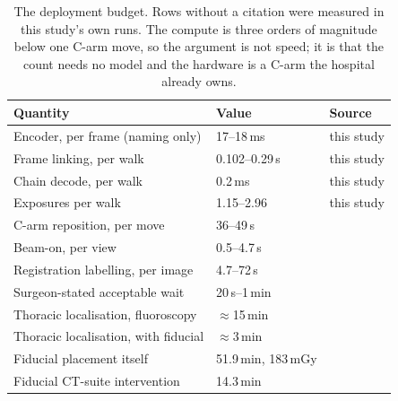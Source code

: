 \documentclass[11pt,letterpaper]{article}
\begin{document}
\begin{table}[htbp]\centering\small
\caption{The deployment budget. Rows without a citation were measured in this study's own runs. The compute
is three orders of magnitude below one C-arm move, so the argument is not speed; it is that the count needs
no model and the hardware is a C-arm the hospital already owns.}
\label{tab:time}
\begin{tabular}{lll}
\toprule
Quantity & Value & Source \\
\midrule
Encoder, per frame (naming only)     & 17--18\,ms          & this study \\
Frame linking, per walk              & 0.102--0.29\,s      & this study \\
Chain decode, per walk               & 0.2\,ms             & this study \\
Exposures per walk                   & 1.15--2.96          & this study \\
\midrule
C-arm reposition, per move           & 36--49\,s           & \citep{matthews2007,desilva2018} \\
Beam-on, per view                    & 0.5--4.7\,s         & \citep{desilva2018} \\
Registration labelling, per image    & 4.7--72\,s          & \citep{levelcheck2012,manbachi2018} \\
Surgeon-stated acceptable wait       & 20\,s--1\,min       & \citep{desilva2016} \\
\midrule
Thoracic localisation, fluoroscopy   & $\approx$15\,min    & \citep{mongardi2021,upadhyaya2012} \\
Thoracic localisation, with fiducial & $\approx$3\,min     & \citep{mongardi2021,upadhyaya2012} \\
Fiducial placement itself            & 51.9\,min, 183\,mGy & \citep{siminski2023} \\
Fiducial CT-suite intervention       & 14.3\,min           & \citep{keil2024} \\
\bottomrule
\end{tabular}
\end{table}

\clearpage


\end{document}
